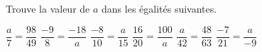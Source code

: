 %
%
Trouve la valeur de $a$ dans les égalités suivantes.
  \begin{tasks}
    \task $\dfrac{a}{7} = \dfrac{98}{49}$
    \task $\dfrac{- 9}{8} = \dfrac{- 18}{a}$
    \task $\dfrac{- 8}{10} = \dfrac{a}{15}$
    \task $\dfrac{16}{20} = \dfrac{100}{a}$
    \task $\dfrac{a}{42} = \dfrac{48}{63}$
    \task $\dfrac{- 7}{21} = \dfrac{a}{- 9}$
  \end{tasks}
